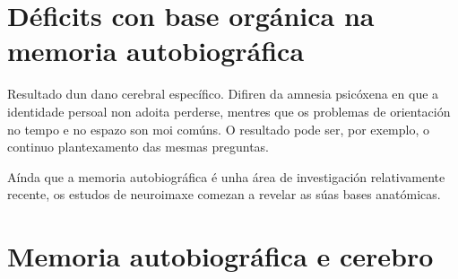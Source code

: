 \documentclass[a4paper,11pt]{article}
\begin{document}
\section{Déficits con base orgánica na memoria autobiográfica}
Resultado dun dano cerebral específico. Difiren da amnesia psicóxena en que a identidade persoal non adoita perderse, mentres que os problemas de orientación no tempo e no espazo son moi comúns. O resultado pode ser, por exemplo, o continuo plantexamento das mesmas preguntas.

Aínda que a memoria autobiográfica é unha área de investigación relativamente recente, os estudos de neuroimaxe comezan a revelar as súas bases anatómicas.

\section{Memoria autobiográfica e cerebro}
\end{document}
